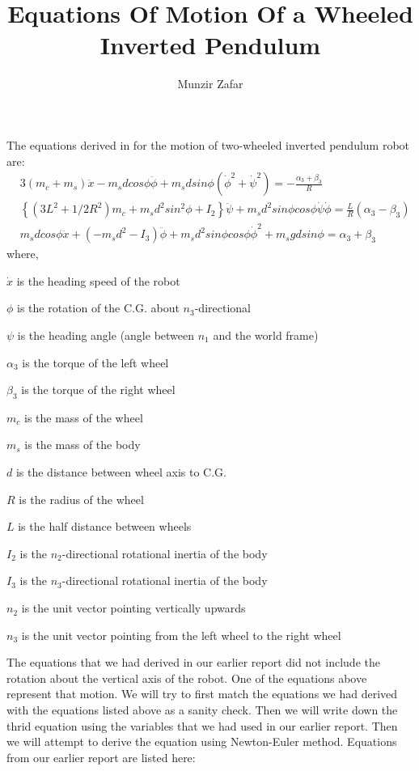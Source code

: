 \documentclass[a4paper,10pt]{article}
\title{Equations Of Motion Of a Wheeled Inverted Pendulum}
\author{Munzir Zafar}
\begin{document}
\maketitle

The equations derived in \cite{kim2005dynamic} for the motion of two-wheeled inverted pendulum robot are:
\begin{align}
 &3(m_c+m_s)\ddot{x}-m_sdcos\phi\ddot{\phi}+m_sdsin\phi({\dot{\phi}}^2+{\dot{\psi}}^2)=-\frac{\alpha_3+\beta_3}{R} \label{eq1}\\
 &\left\lbrace(3L^2+1/2R^2)m_c+m_sd^2sin^2\phi+I_2\right\rbrace\ddot{\psi}+m_sd^2sin\phi cos\phi\dot{\psi}\dot{\phi}=\frac{L}{R}(\alpha_3-\beta_3) \label{eq2}\\
 &m_sdcos\phi\ddot{x}+(-m_sd^2-I_3)\ddot{\phi}+m_sd^2sin\phi cos\phi {\dot{\phi}}^2+m_sgdsin\phi=\alpha_3+\beta_3 \label{eq3}
\end{align} where,

$\dot{x}$ is the heading speed of the robot 

$\phi$ is the rotation of the C.G. about $n_3$-directional 

$\psi$ is the heading angle (angle between $n_1$ and the world frame) 

$\alpha_3$ is the torque of the left wheel 

$\beta_3$ is the torque of the right wheel 

$m_c$ is the mass of the wheel 

$m_s$ is the mass of the body 

$d$ is the distance between wheel axis to C.G. 

$R$ is the radius of the wheel 

$L$ is the half distance between wheels 

$I_2$ is the $n_2$-directional rotational inertia of the body 

$I_3$ is the $n_3$-directional rotational inertia of the body 

$n_2$ is the unit vector pointing vertically upwards 

$n_3$ is the unit vector pointing from the left wheel to the right wheel \newline

The equations that we had derived in our earlier report \cite{munzir2013balancing} did not include
the rotation about the vertical axis of the robot. One of the equations above represent that motion.
We will try to first match the equations we had derived with the equations listed above as a sanity
check. Then we will write down the thrid equation using the variables that we had used in our 
earlier report. Then we will attempt to derive the equation using Newton-Euler method. Equations from
our earlier report are listed here:
\end{document}
